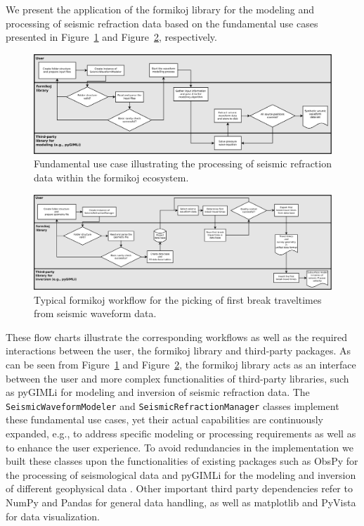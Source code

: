 \documentclass[a4paper,fleqn]{cas-sc}
\begin{document}
We present the application of the formikoj library for the modeling and processing of seismic refraction data based on the fundamental use cases presented in Figure~\ref{fig:modworkflow} and Figure~\ref{fig:procworkflow}, respectively.
\begin{figure}
	\centering
	\includegraphics[width=\textwidth]{figures/workflow_modeling-crop.pdf}
	\caption{Fundamental use case illustrating the processing of seismic refraction data within the formikoj ecosystem.}
	\label{fig:modworkflow}
\end{figure}
\begin{figure}
	\centering
	\includegraphics[width=\textwidth]{figures/workflow_processing-crop.pdf}
	\caption{Typical formikoj workflow for the picking of first break traveltimes from seismic waveform data.}
	\label{fig:procworkflow}
\end{figure}
These flow charts illustrate the corresponding workflows as well as the required interactions between the user, the formikoj library and third-party packages. As can be seen from Figure~\ref{fig:modworkflow} and Figure~\ref{fig:procworkflow}, the formikoj library acts as an interface between the user and more complex functionalities of third-party libraries, such as pyGIMLi for modeling and inversion of seismic refraction data.
The \texttt{SeismicWaveformModeler} and \texttt{SeismicRefractionManager} classes implement these fundamental use cases, yet their actual capabilities are continuously expanded, e.g., to address specific modeling or processing requirements as well as to enhance the user experience. To avoid redundancies in the implementation we built these classes upon the functionalities of existing packages such as ObsPy for the processing of seismological data \citep[][]{beyreuther2010} and pyGIMLi for the modeling and inversion of different geophysical data \citep{ruecker2017}. Other important third party dependencies refer to NumPy \citep{harris2020} and Pandas \citep{mckinney2010} for general data handling, as well as matplotlib \citep{hunter2007} and PyVista \citep{sullivan2019} for data visualization.
\end{document}
